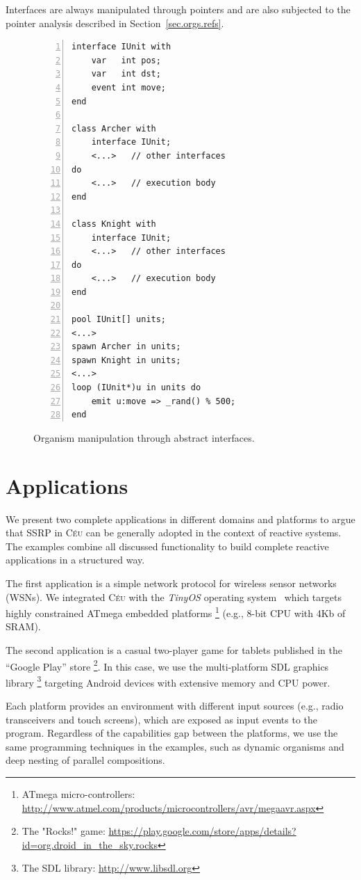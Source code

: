 \documentclass{sigplanconf}
\newcommand{\CEU}{\textsc{C\'{e}u}\xspace}
\newcommand{\1}{\;}
\newcommand{\2}{\;\;}
\newcommand{\3}{\;\;\;}
\newcommand{\5}{\;\;\;\;\;}
\begin{document}
Interfaces are always manipulated through pointers and are also subjected to 
the pointer analysis described in Section~\ref{sec.orgs.refs}.

\begin{figure}%
\begin{lstlisting}[numbers=left,xleftmargin=3em]
interface IUnit with
    var   int pos;
    var   int dst;
    event int move;
end

class Archer with
    interface IUnit;
    <...>   // other interfaces
do
    <...>   // execution body
end

class Knight with
    interface IUnit;
    <...>   // other interfaces
do
    <...>   // execution body
end

pool IUnit[] units;
<...>
spawn Archer in units;
spawn Knight in units;
<...>
loop (IUnit*)u in units do
    emit u:move => _rand() % 500;
end
\end{lstlisting}
\caption{ Organism manipulation through abstract interfaces.
\label{lst.interfaces}
}
\end{figure}

\section{Applications}
\label{sec.apps}

We present two complete applications in different domains and platforms to 
argue that SSRP in \CEU can be generally adopted in the context of reactive 
systems.
The examples combine all discussed functionality to build complete reactive 
applications in a structured way.

The first application is a simple network protocol for wireless sensor networks 
(WSNs).
We integrated \CEU with the \emph{TinyOS} operating system~\cite{wsn.tos} which 
targets highly constrained ATmega embedded platforms%
\footnote{ATmega micro-controllers: 
\url{http://www.atmel.com/products/microcontrollers/avr/megaavr.aspx}}
(e.g., 8-bit CPU with 4Kb of SRAM).

The second application is a casual two-player game for tablets published in the 
``Google Play'' store%
\footnote{The "Rocks!" game: 
\url{https://play.google.com/store/apps/details?id=org.droid_in_the_sky.rocks}}.
In this case, we use the multi-platform SDL graphics library%
\footnote{The SDL library: \url{http://www.libsdl.org}} targeting Android 
devices with extensive memory and CPU power.

Each platform provides an environment with different input sources (e.g., radio 
transceivers and touch screens), which are exposed as input events to the 
program.
%
Regardless of the capabilities gap between the platforms, we use the same 
programming techniques in the examples, such as dynamic organisms and deep 
nesting of parallel compositions.
\end{document}
